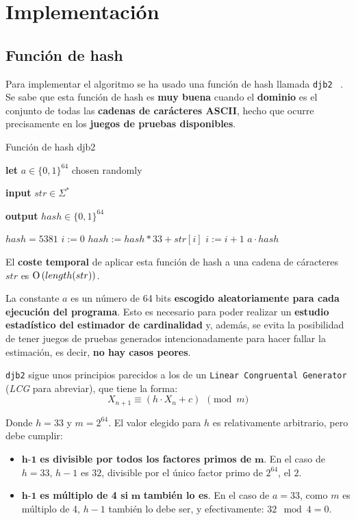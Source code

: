 % 
\section{Implementación}

\subsection{Función de hash}
\label{implementacion:hash}

Para implementar el algoritmo se ha usado una función de hash llamada \texttt{djb2} ~\cite{hash:djb2}.
Se sabe que esta función de hash
es \textbf{muy buena} cuando el \textbf{dominio} es el conjunto de todas las \textbf{cadenas de carácteres ASCII},
hecho que ocurre precisamente en los \textbf{juegos de pruebas disponibles}.

\begin{algorithm}[h]
\caption{Función de hash djb2}
\textbf{let} $a \in \{0, 1\}^{64}$ chosen randomly

\textbf{input} $str \in \Sigma^*$

\textbf{output} $hash \in \{0, 1\}^{64}$
\begin{algorithmic}
    \STATE $hash = 5381$
    \STATE $i := 0$
        \STATE $hash := hash * 33 + str[i]$
        \STATE $i := i + 1$
    \ENDWHILE
    \RETURN $a \cdot hash$
\end{algorithmic}
\end{algorithm}

El \textbf{coste temporal} de aplicar esta función de hash a una cadena de cáracteres $str$ es $\operatorname{O}\left(length(str)\right)$.

La constante $a$ es un número de 64 bits \textbf{escogido aleatoriamente para cada ejecución del programa}.
Esto es necesario para poder realizar un \textbf{estudio estadístico del estimador de cardinalidad} y, además, se evita la posibilidad
de tener juegos de pruebas generados intencionadamente para hacer fallar la estimación, es decir, \textbf{no hay casos peores}.

\texttt{djb2} sigue unos principios parecidos a los de un \texttt{Linear Congruental Generator}  (\emph{LCG} para abreviar),
que tiene la forma:
$$X_{n+1} \equiv \left( h \cdot X_n + c \right)~~\pmod{m}$$

Donde $h=33$ y $m=2^{64}$. El valor elegido para $h$ es relativamente arbitrario, pero debe cumplir:

\begin{itemize}
	\item $\textbf{h-1}$ \textbf{es divisible por todos los factores primos de} $\textbf{m}$.
En el caso de $h=33$, $h-1$ es $32$, divisible por el único factor primo de $2^{64}$, el $2$.

	\item $\textbf{h-1}$ \textbf{es múltiplo de 4 si} $\textbf{m}$ \textbf{también lo es}.
En el caso de $a=33$, como $m$ es múltiplo de 4, $h-1$ también lo debe ser, y efectivamente: $32 \! \mod 4 = 0$.
\end{itemize}

